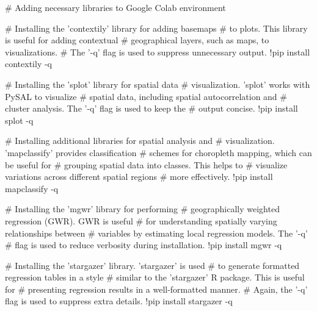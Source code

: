 \documentclass[smallextended, natbib]{svjour3}       %
\begin{document}
\begin{python}
# Adding necessary libraries to Google Colab environment

# Installing the 'contextily' library for adding basemaps
# to plots. This library is useful for adding contextual
# geographical layers, such as maps, to visualizations.
# The '-q' flag is used to suppress unnecessary output.
!pip install contextily -q

# Installing the 'splot' library for spatial data
# visualization. 'splot' works with PySAL to visualize
# spatial data, including spatial autocorrelation and
# cluster analysis. The '-q' flag is used to keep the
# output concise.
!pip install splot -q

# Installing additional libraries for spatial analysis and
# visualization. 'mapclassify' provides classification
# schemes for choropleth mapping, which can be useful for
# grouping spatial data into classes. This helps to
# visualize variations across different spatial regions
# more effectively.
!pip install mapclassify -q  

# Installing the 'mgwr' library for performing
# geographically weighted regression (GWR). GWR is useful
# for understanding spatially varying relationships between
# variables by estimating local regression models. The '-q'
# flag is used to reduce verbosity during installation.
!pip install mgwr -q

# Installing the 'stargazer' library. 'stargazer' is used
# to generate formatted regression tables in a style
# similar to the 'stargazer' R package. This is useful for
# presenting regression results in a well-formatted manner.
# Again, the '-q' flag is used to suppress extra details.
!pip install stargazer -q
\end{python}

\newpage
\end{document}
